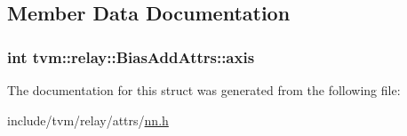 \subsection{Member Data Documentation}
\subsubsection[{\texorpdfstring{axis}{axis}}]{\setlength{\rightskip}{0pt plus 5cm}int tvm\+::relay\+::\+Bias\+Add\+Attrs\+::axis}\hypertarget{structtvm_1_1relay_1_1BiasAddAttrs_aba0f3cd063d2ddff703ae1e714257bb6}{}\label{structtvm_1_1relay_1_1BiasAddAttrs_aba0f3cd063d2ddff703ae1e714257bb6}


The documentation for this struct was generated from the following file\+:\begin{DoxyCompactItemize}
\item 
include/tvm/relay/attrs/\hyperlink{include_2tvm_2relay_2attrs_2nn_8h}{nn.\+h}\end{DoxyCompactItemize}
